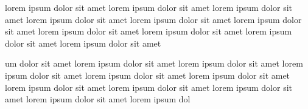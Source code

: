 lorem ipsum dolor sit amet lorem ipsum dolor sit amet lorem ipsum dolor sit amet
lorem ipsum dolor sit amet lorem ipsum dolor sit amet 
lorem ipsum dolor sit amet lorem ipsum dolor sit amet lorem ipsum dolor sit amet
lorem ipsum dolor sit amet lorem ipsum dolor sit amet 

um dolor sit amet lorem ipsum dolor sit amet 
lorem ipsum dolor sit amet lorem ipsum dolor sit amet lorem ipsum dolor sit amet
lorem ipsum dolor sit amet lorem ipsum dolor sit amet 
lorem ipsum dolor sit amet lorem ipsum dolor sit amet lorem ipsum dolor sit amet
lorem ipsum dol










